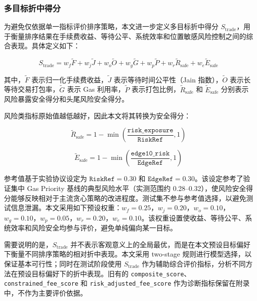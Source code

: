 \subsubsection{多目标折中得分}

为避免仅依据单一指标评价排序策略，本文进一步定义多目标折中得分 $S_{\text{trade}}$，用于衡量排序结果在手续费收益、等待公平、系统效率和位置敏感风险控制之间的综合表现。具体定义如下：

\begin{equation}
S_{\text{trade}}
=
w_f \tilde{F}
+
w_j \tilde{J}
+
w_o \tilde{O}
+
w_g \tilde{G}
+
w_p \tilde{P}
+
w_r \tilde{R}_{\text{safe}}
+
w_e \tilde{E}_{\text{safe}}
\end{equation}

其中，$\tilde{F}$ 表示归一化手续费收益，$\tilde{J}$ 表示等待时间公平性（Jain 指数），$\tilde{O}$ 表示长等待交易打包率，$\tilde{G}$ 表示 Gas 利用率，$\tilde{P}$ 表示打包比例，$\tilde{R}_{\text{safe}}$ 和 $\tilde{E}_{\text{safe}}$ 分别表示风险暴露安全得分和头尾风险安全得分。

风险类指标原始值越低越好，因此本文将其转换为安全得分：

\begin{equation}
\tilde{R}_{\text{safe}}
=
1 -
\min\left(\frac{\texttt{risk\_exposure}}{\texttt{RiskRef}}, 1\right)
\end{equation}

\begin{equation}
\tilde{E}_{\text{safe}}
=
1 -
\min\left(\frac{\texttt{edge10\_risk}}{\texttt{EdgeRef}}, 1\right)
\end{equation}

参考值基于实验协议设定为 $\texttt{RiskRef} = 0.30$ 和 $\texttt{EdgeRef} = 0.30$。该设定参考了验证集中 Gas Priority 基线的典型风险水平（实测范围约 0.28--0.32），使风险安全得分能够反映相对于主流贪心策略的改进程度。测试集不参与参考值选择，以避免测试信息泄漏。本文采用如下预设权重：$w_f{=}0.25$，$w_j{=}0.20$，$w_o{=}0.10$，$w_g{=}0.10$，$w_p{=}0.05$，$w_r{=}0.20$，$w_e{=}0.10$。该权重设置使收益、等待公平、系统效率和风险安全均参与评价，避免单纯偏向某一目标。

需要说明的是，$S_{\text{trade}}$ 并不表示客观意义上的全局最优，而是在本文预设目标偏好下衡量不同排序策略的相对折中表现。本文采用 two-stage 规则进行模型选择，以保证基本可行性；同时在测试阶段使用 $S_{\text{trade}}$ 作为辅助综合评价指标，分析不同方法在预设目标偏好下的折中表现。旧有的 \texttt{composite\_score}、\texttt{constrained\_fee\_score} 和 \texttt{risk\_adjusted\_fee\_score} 作为诊断指标保留在附录中，不作为主要评价依据。

